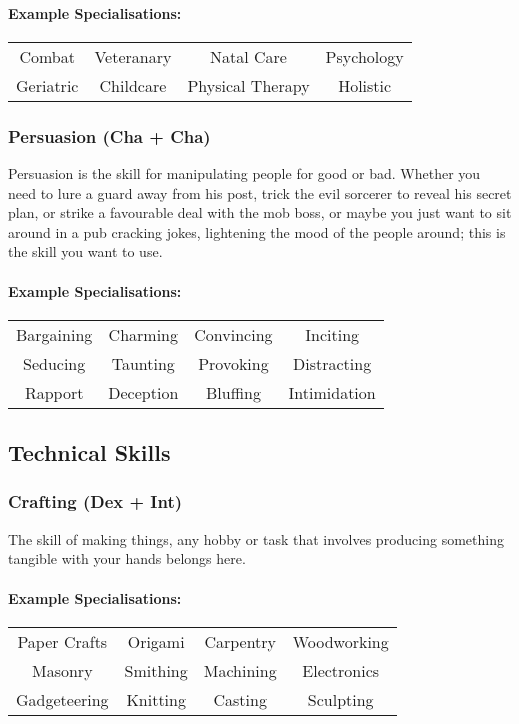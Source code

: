\paragraph{Example Specialisations:}
\begin{center}
    \begin{tabular}{c|c|c|c}
        Combat & Veteranary & Natal Care & Psychology \\
        Geriatric & Childcare & Physical Therapy & Holistic \\
    \end{tabular}
\end{center}

\subsubsection{Persuasion (Cha + Cha)}
Persuasion is the skill for manipulating people for good or bad.
Whether you need to lure a guard away from his post, trick the evil sorcerer to reveal his secret plan, or strike a favourable deal with the mob boss, or maybe you just want to sit around in a pub cracking jokes, lightening the mood of the people around; this is the skill you want to use.

\paragraph{Example Specialisations:}
\begin{center}
    \begin{tabular}{c|c|c|c}
        Bargaining & Charming & Convincing & Inciting \\
        Seducing & Taunting & Provoking & Distracting \\
        Rapport & Deception & Bluffing & Intimidation
    \end{tabular}
\end{center}

\subsection{Technical Skills}
\subsubsection{Crafting (Dex + Int)}
The skill of making things, any hobby or task that involves producing something tangible with your hands belongs here.

\paragraph{Example Specialisations:}
\begin{center}
    \begin{tabular}{c|c|c|c}
        Paper Crafts & Origami & Carpentry & Woodworking \\
        Masonry & Smithing & Machining & Electronics \\
        Gadgeteering & Knitting & Casting & Sculpting \\
    \end{tabular}
\end{center}

